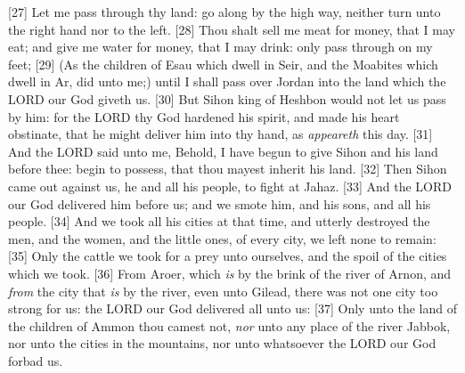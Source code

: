 [27] \textcolor[cmyk]{0.99998,1,0,0}{Let me pass through thy land:  go along by the high way,  neither turn unto the right hand nor to the left.}
[28] \textcolor[cmyk]{0.99998,1,0,0}{Thou shalt sell me meat for money, that I may eat; and give me water for money, that I may drink: only  pass through on my feet;}
[29] \textcolor[cmyk]{0.99998,1,0,0}{(As the children of Esau which dwell in Seir, and the Moabites which dwell in Ar, did unto me;) until I shall pass over Jordan into the land which the LORD our God giveth us.}
[30] \textcolor[cmyk]{0.99998,1,0,0}{But Sihon king of Heshbon would not let us pass by him: for the LORD thy God hardened his spirit, and made his heart obstinate, that he might deliver him into thy hand, as \emph{appeareth} this day.}
[31] \textcolor[cmyk]{0.99998,1,0,0}{And the LORD said unto me, Behold, I have begun to give Sihon and his land before thee: begin to possess, that thou mayest inherit his land.}
[32] \textcolor[cmyk]{0.99998,1,0,0}{Then Sihon came out against us, he and all his people, to fight at Jahaz.}
[33] \textcolor[cmyk]{0.99998,1,0,0}{And the LORD our God delivered him before us; and we smote him, and his sons, and all his people.}
[34] \textcolor[cmyk]{0.99998,1,0,0}{And we took all his cities at that time, and utterly destroyed the men, and the women, and the little ones, of every city, we left none to remain:}
[35] \textcolor[cmyk]{0.99998,1,0,0}{Only the cattle we took for a prey unto ourselves, and the spoil of the cities which we took.}
[36] \textcolor[cmyk]{0.99998,1,0,0}{From Aroer, which \emph{is} by the brink of the river of Arnon, and \emph{from} the city that \emph{is} by the river, even unto Gilead, there was not one city too strong for us: the LORD our God delivered all unto us:}
[37] \textcolor[cmyk]{0.99998,1,0,0}{Only unto the land of the children of Ammon thou camest not, \emph{nor} unto any place of the river Jabbok, nor unto the cities in the mountains, nor unto whatsoever the LORD our God forbad us.}